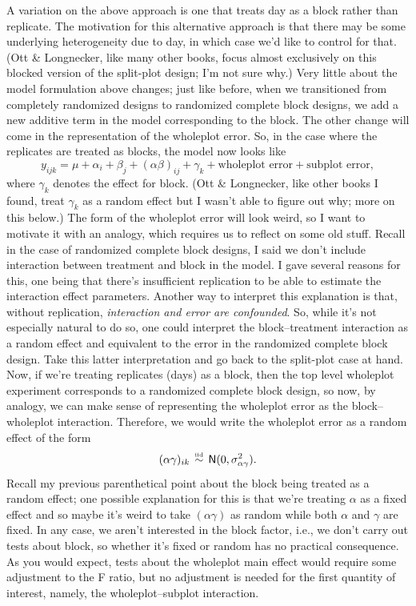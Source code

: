 \documentclass[a4paper, 12pt]{article}
\theoremstyle{plain}
\theoremstyle{definition}
\theoremstyle{remark}
\newcommand{\nm}{\mathsf{N}}
\newcommand{\iid}{\overset{\text{\tiny iid}}{\,\sim\,}}
\begin{document}
A variation on the above approach is one that treats day as a block rather than replicate.  The motivation for this alternative approach is that there may be some underlying heterogeneity due to day, in which case we'd like to control for that.  (Ott \& Longnecker, like many other books, focus almost exclusively on this blocked version of the split-plot design; I'm not sure why.)  Very little about the model formulation above changes; just like before, when we transitioned from completely randomized designs to randomized complete block designs, we add a new additive term in the model corresponding to the block.  The other change will come in the representation of the wholeplot error.  So, in the case where the replicates are treated as blocks, the model now looks like 
\[ y_{ijk} = \mu + \alpha_i + \beta_j + (\alpha\beta)_{ij} + \gamma_k + \text{wholeplot error} + \text{subplot error}, \]
where $\gamma_k$ denotes the effect for block.  (Ott \& Longnecker, like other books I found, treat $\gamma_k$ as a random effect but I wasn't able to figure out why; more on this below.)  The form of the wholeplot error will look weird, so I want to motivate it with an analogy, which requires us to reflect on some old stuff.  Recall in the case of randomized complete block designs, I said we don't include interaction between treatment and block in the model.  I gave several reasons for this, one being that there's insufficient replication to be able to estimate the interaction effect parameters.  Another way to interpret this explanation is that, without replication, {\em interaction and error are confounded}.  So, while it's not especially natural to do so, one could interpret the block--treatment interaction as a random effect and equivalent to the error in the randomized complete block design.  Take this latter interpretation and go back to the split-plot case at hand.  Now, if we're treating replicates (days) as a block, then the top level wholeplot experiment corresponds to a randomized complete block design, so now, by analogy, we can make sense of representing the wholeplot error as the block--wholeplot interaction.  Therefore, we would write the wholeplot error as a random effect of the form 
\[ (\alpha\gamma)_{ik} \iid \nm(0, \sigma_{\alpha\gamma}^2). \]
Recall my previous parenthetical point about the block being treated as a random effect; one possible explanation for this is that we're treating $\alpha$ as a fixed effect and so maybe it's weird to take $(\alpha\gamma)$ as random while both $\alpha$ and $\gamma$ are fixed.  In any case, we aren't interested in the block factor, i.e., we don't carry out tests about block, so whether it's fixed or random has no practical consequence.  As you would expect, tests about the wholeplot main effect would require some adjustment to the F ratio, but no adjustment is needed for the first quantity of interest, namely, the wholeplot--subplot interaction.  
\end{document}
